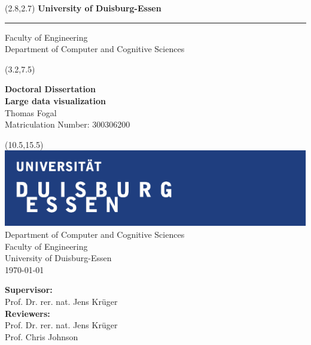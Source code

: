 \begin{titlepage}
\vspace*{-1cm}
\newlength{\links}
\setlength{\links}{0.9cm}
\setlength{\TPHorizModule}{1cm}
\setlength{\TPVertModule}{1cm}

\sf
\LARGE

\begin{textblock}{16.5}(2.8,2.7)
 \hspace*{-0.8cm} \textbf{University of Duisburg-Essen} \\
 \hspace*{-1.15cm} \rule{5mm}{5mm} \hspace*{0.0cm} Faculty of Engineering\\
 \large{}Department of Computer and Cognitive Sciences\\
\end{textblock}

\begin{textblock}{14.5}(3.2,7.5)
\begin{center}
  \large
{\bf Doctoral Dissertation} \\[1cm]
{ \LARGE  \bf Large data visualization} \\[1.3cm]
Thomas Fogal\\
Matriculation Number: 300306200
\end{center}
\end{textblock}

\begin{textblock}{10}(10.5,15.5)
\includegraphics[width=.94\textwidth]{images/unilogo}\\
\normalsize
\raggedleft
Department of Computer and Cognitive Sciences \\
Faculty of Engineering \\
University of Duisburg-Essen \\[2ex]

\today\\[13ex]
\raggedright
{\bf Supervisor:} \\
Prof. Dr. rer. nat. Jens Kr\"uger\\

{\bf Reviewers:}\\
Prof. Dr. rer. nat. Jens Kr\"uger\\
Prof. Chris Johnson\\
\\
\end{textblock}

\end{titlepage}

